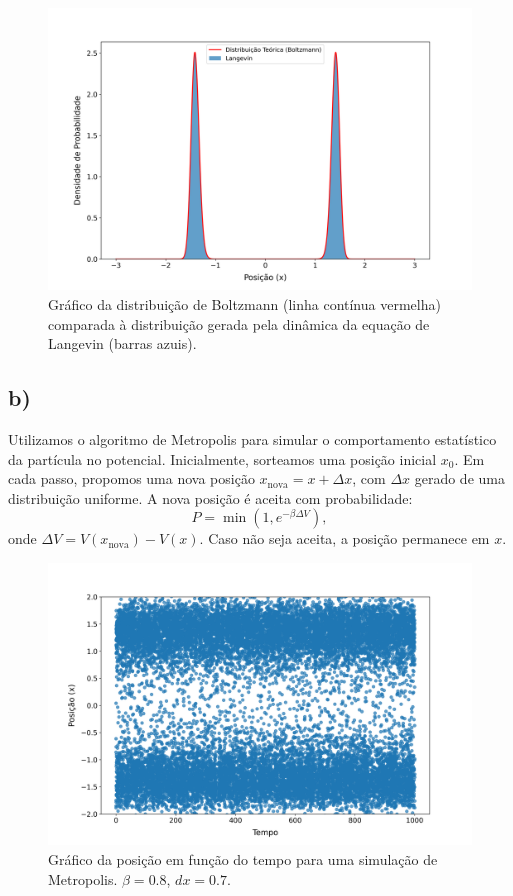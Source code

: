 \documentclass[a4paper, 12pt]{article}
\begin{document}
\begin{figure}[H]
    \centering
    \includegraphics[scale=0.39]{Q2_a.png}
    \caption{Gráfico da distribuição de Boltzmann (linha contínua vermelha) comparada à distribuição gerada pela dinâmica da equação de Langevin (barras azuis).}
    \label{fig:Q2_a}
\end{figure}

\subsection*{b)}

Utilizamos o algoritmo de Metropolis para simular o comportamento estatístico da partícula no potencial. Inicialmente, sorteamos uma posição inicial \(x_0\). Em cada passo, propomos uma nova posição \(x_{\text{nova}} = x + \Delta x\), com \(\Delta x\) gerado de uma distribuição uniforme. A nova posição é aceita com probabilidade:
\begin{equation}
P = \min(1, e^{-\beta \Delta V}),
\end{equation}
onde \(\Delta V = V(x_{\text{nova}}) - V(x)\). Caso não seja aceita, a posição permanece em \(x\).

\begin{figure}[H]
    \centering
    \includegraphics[scale=0.39]{Q2_b.png}
    \caption{Gráfico da posição em função do tempo para uma simulação de Metropolis. \(\beta = 0.8\), \(dx = 0.7\).}
    \label{fig:Q2_b}
\end{figure}
\end{document}
